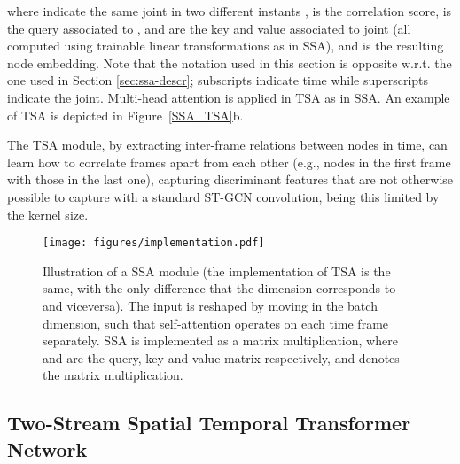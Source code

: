 \documentclass[times,twocolumn,final,authoryear]{elsarticle}
\begin{document}
where  indicate the same joint  in two different instants ,  is the correlation score,  is the query associated to ,  and  are the key and value associated to joint  (all computed using trainable linear transformations as in SSA), and  is the resulting node embedding. Note that  the notation used in this section is opposite w.r.t. the one used in Section \ref{sec:ssa-descr}; subscripts indicate time while superscripts indicate the joint. Multi-head attention is applied in TSA as in SSA. An example of TSA is depicted in Figure~\ref{SSA_TSA}b.

The TSA module, by extracting inter-frame relations between nodes in time, can learn how to correlate frames apart from each other (e.g., nodes in the first frame with those in the last one), capturing discriminant features that are not otherwise possible to capture with a standard ST-GCN convolution, being this limited by the kernel size.




\begin{figure}[t]
    \centering
    \texttt{[image: figures/implementation.pdf]}
    \caption{Illustration of a SSA module (the implementation of TSA is the same, with the only difference that the dimension  corresponds to  and viceversa). The input  is reshaped by moving  in the batch dimension, such that self-attention operates on each time frame separately. SSA is implemented as a matrix multiplication, where  and  are the query, key and value matrix respectively, and  denotes the matrix multiplication. }
    \label{implementation}
\end{figure}

\subsection{Two-Stream Spatial Temporal Transformer Network}\label{2s}
\end{document}
